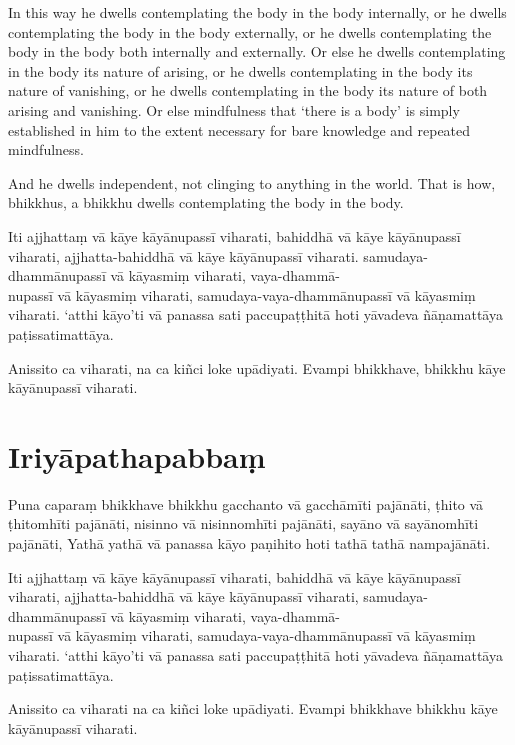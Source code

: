 In this way he dwells contemplating the body in the body internally, or he
dwells contemplating the body in the body externally, or he dwells contemplating
the body in the body both internally and externally. Or else he dwells
contemplating in the body its nature of arising, or he dwells contemplating in
the body its nature of vanishing, or he dwells contemplating in the body its
nature of both arising and vanishing. Or else mindfulness that ‘there is a body’
is simply established in him to the extent necessary for bare knowledge and
repeated mindfulness.

And he dwells independent, not clinging to anything in the world. That is how,
bhikkhus, a bhikkhu dwells contemplating the body in the body.


\paliPage

Iti ajjhattaṃ vā kāye kāyānupassī viharati, bahiddhā vā kāye kāyānupassī
viharati, ajjhatta-bahiddhā vā kāye kāyānupassī viharati. samudaya-dhammānupassī
vā kāyasmiṃ viharati, vaya-dhammā-\\
nupassī vā kāyasmiṃ viharati, samudaya-vaya-dhammānupassī vā kāyasmiṃ viharati.
‘atthi kāyo’ti vā panassa sati paccupaṭṭhitā hoti yāvadeva ñāṇamattāya
paṭissatimattāya.

Anissito ca viharati, na ca kiñci loke upādiyati. Evampi bhikkhave, bhikkhu kāye
kāyānupassī viharati.


\section*{Iriyāpathapabbaṃ}

Puna caparaṃ bhikkhave bhikkhu gacchanto vā gacchāmīti pajānāti, ṭhito vā
ṭhitomhīti pajānāti, nisinno vā nisinnomhīti pajānāti, sayāno vā sayānomhīti
pajānāti, Yathā yathā vā panassa kāyo paṇihito hoti tathā tathā nampajānāti.

Iti ajjhattaṃ vā kāye kāyānupassī viharati, bahiddhā vā kāye kāyānupassī
viharati, ajjhatta-bahiddhā vā kāye kāyānupassī viharati, samudaya-dhammānupassī
vā kāyasmiṃ viharati, vaya-dhammā-\\
nupassī vā kāyasmiṃ viharati, samudaya-vaya-dhammānupassī vā kāyasmiṃ viharati.
`atthi kāyo'ti vā panassa sati paccupaṭṭhitā hoti yāvadeva ñāṇamattāya
paṭissatimattāya.

Anissito ca viharati na ca kiñci loke upādiyati. Evampi bhikkhave bhikkhu kāye
kāyānupassī viharati.

